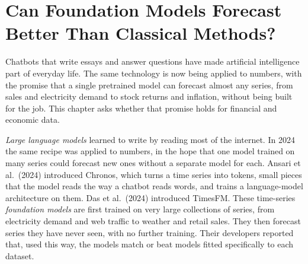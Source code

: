 \makeatletter
{}
\makeatother

\makeatletter
\makeatother

\chapter{Can Foundation Models Forecast Better Than Classical Methods?}
\label{ch:21}
\providecommand{\term}[1]{\emph{#1}}

Chatbots that write essays and answer questions have made artificial intelligence part of everyday life. The same technology is now being applied to numbers, with the promise that a single pretrained model can forecast almost any series, from sales and electricity demand to stock returns and inflation, without being built for the job. This chapter asks whether that promise holds for financial and economic data.

\term{Large language models} learned to write by reading most of the internet. In 2024 the same recipe was applied to numbers, in the hope that one model trained on many series could forecast new ones without a separate model for each. Ansari et al.\ (2024) introduced Chronos, which turns a time series into tokens, small pieces that the model reads the way a chatbot reads words, and trains a language-model architecture on them. Das et al.\ (2024) introduced TimesFM. These time-series \term{foundation models} are first trained on very large collections of series, from electricity demand and web traffic to weather and retail sales. They then forecast series they have never seen, with no further training. Their developers reported that, used this way, the models match or beat models fitted specifically to each dataset.

